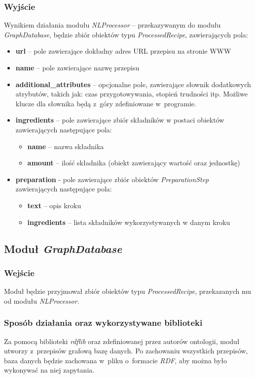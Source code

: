 \documentclass[11pt,a4paper]{article}
\begin{document}
\subsubsection{Wyjście}
Wynikiem działania modułu \textit{NLProcessor} -- przekazywanym do modułu \textit{GraphDatabase}, będzie zbiór obiektów typu \textit{ProcessedRecipe}, zawierających pola:
\begin{itemize}
  \item \textbf{url} -- pole zawierające dokładny adres URL przepisu na stronie WWW
  \item \textbf{name} -- pole zawierające nazwę przepisu
  \item \textbf{additional\_attributes} -- opcjonalne pole, zawierające słownik dodatkowych atrybutów, takich jak: czas przygotowywania, stopień trudności itp. Możliwe klucze dla słownika będą z~góry zdefiniowane w~programie.
  \item \textbf{ingredients} -- pole zawierające zbiór składników w postaci obiektów zawierających następujące pola:
  \begin{itemize}
    \item \textbf{name} -- nazwa składnika
    \item \textbf{amount} -- ilość składnika (obiekt zawierający wartość oraz jednostkę)
  \end{itemize}
  \item \textbf{preparation} - pole zawierające zbiór obiektów \textit{PreparationStep} zawierających następujące pola:
    \begin{itemize}
    \item \textbf{text} -- opis kroku
    \item \textbf{ingredients} -- lista składników wykorzystywanych w danym kroku
  \end{itemize}
\end{itemize}

\subsection{Moduł \textit{GraphDatabase}}
\subsubsection{Wejście}
Moduł będzie przyjmował zbiór obiektów typu \textit{ProcessedRecipe}, przekazanych mu od modułu \textit{NLProcessor}.
\subsubsection{Sposób działania oraz wykorzystywane biblioteki}
Za pomocą biblioteki \textit{rdflib} oraz zdefiniowanej przez autorów ontologii, moduł utworzy z~przepisów grafową bazę danych. Po zachowaniu wszystkich przepisów, baza danych będzie zachowana w~pliku o~formacie \textit{RDF}, aby można było wykonywać na niej zapytania.
\end{document}
